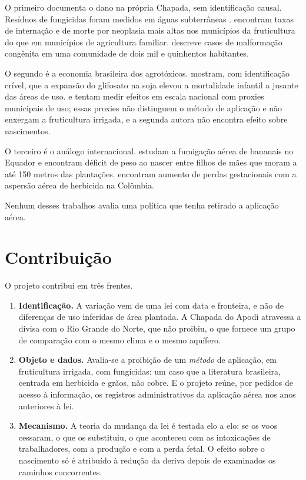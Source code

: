 O primeiro documenta o dano na própria Chapada, sem identificação causal.
Resíduos de fungicidas foram medidos em águas subterrâneas
\cite{tramas2016parecer}.  encontram taxas de
internação e de morte por neoplasia mais altas nos municípios da fruticultura
do que em municípios de agricultura familiar.  descreve
casos de malformação congênita em uma comunidade de dois mil e quinhentos
habitantes.

O segundo é a economia brasileira dos agrotóxicos. 
mostram, com identificação crível, que a expansão do glifosato na soja elevou a
mortalidade infantil a jusante das áreas de uso. 
e  tentam medir efeitos em escala nacional com proxies
municipais de uso; essas proxies não distinguem o método de aplicação e não
enxergam a fruticultura irrigada, e a segunda autora não encontra efeito sobre
nascimentos.

O terceiro é o análogo internacional.  estudam a
fumigação aérea de bananais no Equador e encontram déficit de peso ao nascer
entre filhos de mães que moram a até 150 metros das plantações.
 encontram aumento de perdas gestacionais com a
aspersão aérea de herbicida na Colômbia.

Nenhum desses trabalhos avalia uma política que tenha retirado a aplicação
aérea.

\section{Contribuição}

O projeto contribui em três frentes.

\begin{enumerate}
\item \textbf{Identificação.} A variação vem de uma lei com data e fronteira, e
não de diferenças de uso inferidas de área plantada. A Chapada do Apodi
atravessa a divisa com o Rio Grande do Norte, que não proibiu, o que fornece um
grupo de comparação com o mesmo clima e o mesmo aquífero.
\item \textbf{Objeto e dados.} Avalia-se a proibição de um \emph{método} de
aplicação, em fruticultura irrigada, com fungicidas: um caso que a literatura
brasileira, centrada em herbicida e grãos, não cobre. E o projeto reúne, por
pedidos de acesso à informação, os registros administrativos da aplicação aérea
nos anos anteriores à lei.
\item \textbf{Mecanismo.} A teoria da mudança da lei é testada elo a elo: se os
voos cessaram, o que os substituiu, o que aconteceu com as intoxicações de
trabalhadores, com a produção e com a perda fetal. O efeito sobre o nascimento
só é atribuído à redução da deriva depois de examinados os caminhos
concorrentes.
\end{enumerate}

